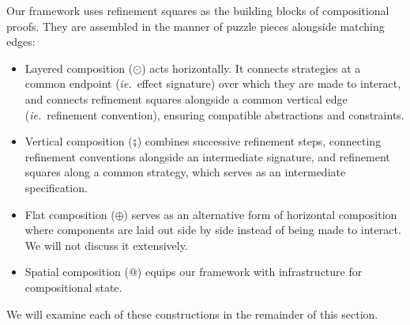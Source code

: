Our framework uses
refinement squares as the building blocks of compositional proofs.
They are assembled in the manner of puzzle pieces
alongside matching edges:
\begin{itemize}
\item Layered composition ($\odot$) acts horizontally.
  It connects strategies at a common endpoint (\emph{ie.}~effect signature)
  over which they are made to interact,
  and connects refinement squares alongside a common
  vertical edge (\emph{ie.}~refinement convention),
  ensuring compatible abstractions and constraints.
\item Vertical composition ($\fatsemi$)
  combines successive refinement steps,
  connecting refinement conventions alongside an intermediate signature,
  and refinement squares along a common strategy,
  which serves as an intermediate specification.
\item Flat composition ($\oplus$)
  serves as an alternative form of horizontal composition
  where components are laid out side by side
  instead of being made to interact.
  We will not discuss it extensively.
\item Spatial composition ($\mathbin@$)
  equips our framework with infrastructure
  for compositional state.
\end{itemize}
We will examine each of these constructions in the remainder of this section.



